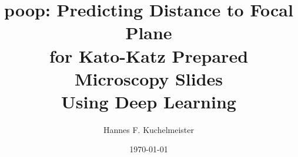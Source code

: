 \title{\Acs{poop}: Predicting Distance to Focal Plane\\for Kato-Katz Prepared Microscopy Slides\\Using Deep Learning}
\author{Hannes F. Kuchelmeister}
\date{\today}

\maketitle
